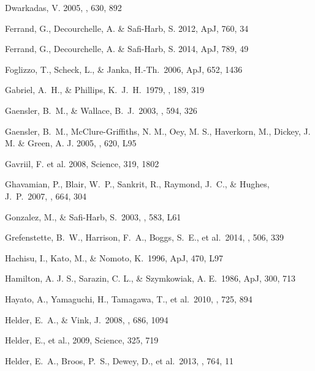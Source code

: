 \documentclass[11pt,a4paper]{article}
\begin{document}
{\begin{multicols}{2}
{\begin{thebibliography}{99}
Dwarkadas, V. 2005, \apj, 630, 892

Ferrand, G., Decourchelle, A. \& Safi-Harb, S. 2012, ApJ, 760, 34


Ferrand, G., Decourchelle, A. \& Safi-Harb, S. 2014, ApJ, 789, 49

Foglizzo, T., Scheck, L., \& Janka, H.-Th.~2006, ApJ, 652, 1436


 Gabriel,
  A.~H., \& Phillips, K.~J.~H.\ 1979, \mnras, 189, 319

 Gaensler, B.~M., \&
  Wallace, B.~J.\ 2003, \apj, 594, 326

 Gaensler, B.~M.,
McClure-Griffiths, N. M., Oey, M. S.,  Haverkorn, M., Dickey, J. M. \& Green, A. J. 2005,
\apj, 620, L95

Gavriil, F. et al. 2008, Science, 319, 1802

Ghavamian, P., Blair, 
W.~P., Sankrit, R., Raymond, J.~C., \& Hughes, J.~P.\ 2007, \apj, 664, 304 

 Gonzalez, M., \&
  Safi-Harb, S.~2003, \apj, 583, L61

 Grefenstette, B.~W.,
  Harrison, F.~A., Boggs, S.~E., et al.\ 2014, \nat, 506, 339

 Hachisu, I., Kato, M.,
\& Nomoto, K.\ 1996, ApJ, 470, L97 

Hamilton, A. J. S., Sarazin, C. L., \& Szymkowiak, A. E.\ 1986, ApJ, 300, 713


 Hayato, A., Yamaguchi, 
H., Tamagawa, T., et al.\ 2010, \apj, 725, 894 


 Helder, E.~A., \& Vink, J.\ 2008, \apj, 686, 1094 

 Helder, E., et al., 2009, Science, 325, 719 

 Helder, E.~A., Broos, 
P.~S., Dewey, D., et al.\ 2013, \apj, 764, 11 


\end{thebibliography}}
\end{multicols}}
\end{document}
